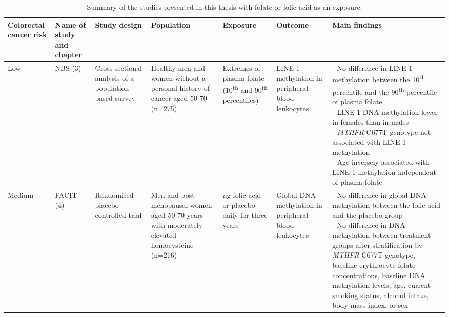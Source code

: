 \begin{sidewaystable}
\footnotesize
\caption{Summary of the studies presented in this thesis with folate or folic acid as an exposure.} 
\label{table7_1}
\begin{tabular}{L{1.3cm}C{1.5cm}C{2cm}C{2.1cm}C{2.1cm}C{2.1cm}C{4cm}}
\hline
\bfseries Colorectal cancer risk & \bfseries Name of study and chapter & \bfseries Study design & \bfseries Population & \bfseries Exposure & \bfseries Outcome & \bfseries Main findings\\
\hline
\parbox[t][5.2cm]{1.3cm}{Low} &
\parbox[t][5.2cm]{1.5cm}{\centering NBS (3)} &
\parbox[t][5.2cm]{2cm}{\centering Cross-sectional analysis of a population-based survey} &
\parbox[t][5.2cm]{2.1cm}{\centering Healthy men and women without a personal history of cancer aged 50-70 (n=275)} &
\parbox[t][5.2cm]{2.1cm}{\centering Extremes of plasma folate (10\textsuperscript{th} and 90\textsuperscript{th} percentiles)} &
\parbox[t][5.2cm]{2.1cm}{\centering LINE-1 methylation in peripheral blood leukocytes} & 
\parbox[t][5.2cm]{4cm}{ \centering - No difference in LINE-1 methylation between the 10\textsuperscript{th} percentile and the 90\textsuperscript{th} percentile of plasma folate\\
- LINE-1 DNA methylation lower in females than in males\\
- \emph{MTHFR} C677T genotype not associated with LINE-1 methylation\\
- Age inversely associated with LINE-1 methylation independent of plasma folate}\\

\parbox[t][5.2cm]{1.3cm}{Medium} &
\parbox[t][5.2cm]{1.5cm}{\centering FACIT (4)} &
\parbox[t][5.2cm]{2cm}{\centering Randomised placebo-controlled trial} &
\parbox[t][5.2cm]{2.1cm}{\centering Men and post-menopausal women aged 50-70 years with moderately elevated homocysteine (n=216)} &
\parbox[t][5.2cm]{2.1cm}{ $\mu$g folic acid or placebo daily for three years} &
\parbox[t][5.2cm]{2.1cm}{\centering Global DNA methylation in peripheral blood leukocytes} &
\parbox[t][5.2cm]{4cm}{ \centering - No difference in global DNA methylation between the folic acid and the placebo group \\ - No difference in DNA methylation between treatment groups after stratification by \textit{MTHFR} C677T genotype, baseline erythrocyte folate concentrations, baseline DNA methylation levels, age, current smoking status, alcohol intake, body mass index, or sex}\\
\hline
\end{tabular}
\end{sidewaystable}


